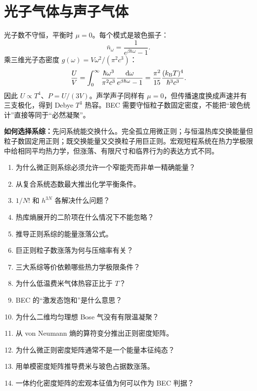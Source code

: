 \section{光子气体与声子气体}
光子数不守恒，平衡时 $\mu=0$。每个模式是玻色振子：
\[
\bar n_\omega=\frac1{e^{\beta\hbar\omega}-1}.
\]
乘三维光子态密度
$g(\omega)=V\omega^2/(\pi^2c^3)$：
\[
\frac UV=\int_0^\infty
\frac{\hbar\omega^3}{\pi^2c^3}
\frac{\mathrm d\omega}{e^{\beta\hbar\omega}-1}
=\frac{\pi^2}{15}
\frac{(k_{\mathrm B} T)^4}{\hbar^3c^3}.
\]
因此 $U\propto T^4$、$P=U/(3V)$。声学声子同样有 $\mu=0$，但传播速度换成声速并有三支极化，得到 Debye $T^3$ 热容。BEC 需要守恒粒子数固定密度，不能把“玻色统计”直接等同于“必然凝聚”。

\begin{interviewbox}
\textbf{如何选择系综：}先问系统能交换什么。完全孤立用微正则；与恒温热库交换能量但粒子数固定用正则；既交换能量又交换粒子用巨正则。宏观短程系统在热力学极限中给相同平均热力学，但涨落、有限尺寸和临界行为的表达方式不同。
\end{interviewbox}

\begin{selftestbox}
\begin{enumerate}
\item 为什么微正则系综必须允许一个窄能壳而非单一精确能量？
\item 从复合系统态数最大推出化学平衡条件。
\item $1/N!$ 和 $h^{3N}$ 各解决什么问题？
\item 热库熵展开的二阶项在什么情况下不能忽略？
\item 推导正则系综的能量涨落公式。
\item 巨正则粒子数涨落为何与压缩率有关？
\item 三大系综等价依赖哪些热力学极限条件？
\item 为什么低温费米气体热容正比于 $T$？
\item BEC 的“激发态饱和”是什么意思？
\item 为什么二维均匀理想 Bose 气没有有限温凝聚？
\item 从 von Neumann 熵的算符变分推出正则密度矩阵。
\item 为什么微正则密度矩阵通常不是一个能量本征纯态？
\item 用单模密度矩阵推导费米与玻色占据数涨落。
\item 一体约化密度矩阵的宏观本征值为何可以作为 BEC 判据？
\end{enumerate}
\end{selftestbox}
